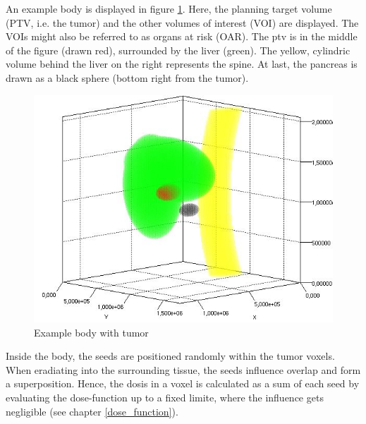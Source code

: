 \documentclass[12pt]{article}
\begin{document}
An example body is displayed in figure \ref{model:body}. Here, the planning target volume (PTV, i.e. the tumor) and the other volumes of interest (VOI) are displayed. The VOIs might also be referred to as organs at risk (OAR). The ptv is in the middle of the figure (drawn red), surrounded by the liver (green). The yellow, cylindric volume behind the liver on the right represents the spine. At last, the pancreas is drawn as a black sphere (bottom right from the tumor).
\begin{figure}
\centering
\includegraphics[width=.7\textwidth]{pictures/body}
\caption{Example body with tumor}
\label{model:body}
\end{figure}

Inside the body, the seeds are positioned randomly within the tumor voxels. When eradiating into the surrounding tissue, the seeds influence overlap and form a superposition. Hence, the dosis in a voxel is calculated as a sum of each seed by evaluating the dose-function up to a fixed limite, where the influence gets negligible (see chapter \ref{dose_function}).
\end{document}

